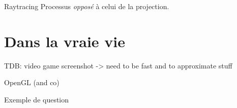 \documentclass[compress]{beamer}
\begin{document}
\begin{frame}{Raytracing}
    Processus \emph{opposé} à celui de la projection.
\end{frame}


\section{Dans la vraie vie}

\begin{frame}{}
    TDB: video game screenshot
    -> need to be fast and to approximate stuff
\end{frame}

\begin{frame}{}
    OpenGL (and co)
\end{frame}


\begin{frame}{Exemple de question}
\end{frame}
\end{document}
